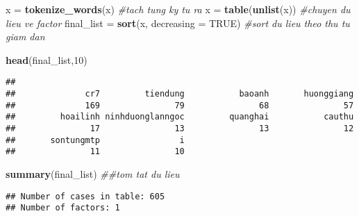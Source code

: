\documentclass[]{article}
\newenvironment{Shaded}{\begin{snugshade}}{\end{snugshade}}
\newcommand{\CommentTok}[1]{\textcolor[rgb]{0.56,0.35,0.01}{\textit{#1}}}
\newcommand{\DataTypeTok}[1]{\textcolor[rgb]{0.13,0.29,0.53}{#1}}
\newcommand{\DecValTok}[1]{\textcolor[rgb]{0.00,0.00,0.81}{#1}}
\newcommand{\KeywordTok}[1]{\textcolor[rgb]{0.13,0.29,0.53}{\textbf{#1}}}
\newcommand{\NormalTok}[1]{#1}
\newcommand{\OtherTok}[1]{\textcolor[rgb]{0.56,0.35,0.01}{#1}}
\newcommand{\StringTok}[1]{\textcolor[rgb]{0.31,0.60,0.02}{#1}}
\begin{document}
\begin{Shaded}
\begin{Highlighting}[]
\NormalTok{x =}\StringTok{ }\KeywordTok{tokenize_words}\NormalTok{(x) }\CommentTok{#tach tung ky tu ra }
\NormalTok{x =}\StringTok{ }\KeywordTok{table}\NormalTok{(}\KeywordTok{unlist}\NormalTok{(x)) }\CommentTok{#chuyen du lieu ve factor}
\NormalTok{final_list =}\StringTok{ }\KeywordTok{sort}\NormalTok{(x, }\DataTypeTok{decreasing =} \OtherTok{TRUE}\NormalTok{) }\CommentTok{#sort du lieu theo thu tu giam dan}

\KeywordTok{head}\NormalTok{(final_list,}\DecValTok{10}\NormalTok{)}
\end{Highlighting}
\end{Shaded}

\begin{verbatim}
## 
##              cr7         tiendung           baoanh       huonggiang 
##              169               79               68               57 
##         hoailinh ninhduonglanngoc         quanghai           cauthu 
##               17               13               13               12 
##       sontungmtp                i 
##               11               10
\end{verbatim}

\begin{Shaded}
\begin{Highlighting}[]
\KeywordTok{summary}\NormalTok{(final_list) }\CommentTok{##tom tat du lieu}
\end{Highlighting}
\end{Shaded}

\begin{verbatim}
## Number of cases in table: 605 
## Number of factors: 1
\end{verbatim}
\end{document}
